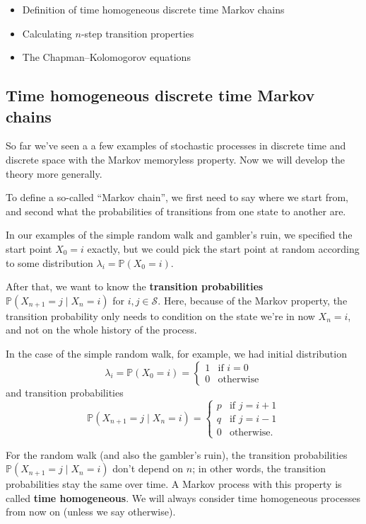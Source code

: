 \documentclass[
  a4paper,
]{article}
\providecommand{\tightlist}{%
  \setlength{\itemsep}{0pt}\setlength{\parskip}{0pt}}
\theoremstyle{definition}
\theoremstyle{definition}
\theoremstyle{definition}
\theoremstyle{remark}
\begin{document}
\begin{itemize}
\tightlist
\item
  Definition of time homogeneous discrete time Markov chains
\item
  Calculating \(n\)-step transition properties
\item
  The Chapman--Kolomogorov equations
\end{itemize}

\hypertarget{thmc}{%
\subsection{Time homogeneous discrete time Markov chains}\label{thmc}}

So far we've seen a a few examples of stochastic processes in discrete time and discrete space with the Markov memoryless property. Now we will develop the theory more generally.

To define a so-called ``Markov chain'', we first need to say where we start from, and second what the probabilities of transitions from one state to another are.

In our examples of the simple random walk and gambler's ruin, we specified the start point \(X_0 = i\) exactly, but we could pick the start point at random according to some distribution \(\lambda_i = \mathbb P(X_0 = i)\).

After that, we want to know the \textbf{transition probabilities} \(\mathbb P(X_{n+1} = j \mid X_n = i)\) for \(i,j \in \mathcal S\). Here, because of the Markov property, the transition probability only needs to condition on the state we're in now \(X_n = i\), and not on the whole history of the process.

In the case of the simple random walk, for example, we had initial distribution
\[ \lambda_i = \mathbb P(X_0 = i) = \begin{cases} 1 & \text{if $i = 0$} \\ 0 & \text{otherwise} \end{cases} \]
and transition probabilities
\[ \mathbb P(X_{n+1} = j \mid X_n = i) = \begin{cases} p & \text{if $j = i+1$} \\ q & \text{if $j = i-1$} \\ 0 & \text{otherwise.} \end{cases} \]

For the random walk (and also the gambler's ruin), the transition probabilities \(\mathbb P(X_{n+1} = j \mid X_n = i)\) don't depend on \(n\); in other words, the transition probabilities stay the same over time. A Markov process with this property is called \textbf{time homogeneous}. We will always consider time homogeneous processes from now on (unless we say otherwise).
\end{document}
